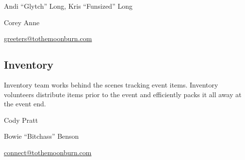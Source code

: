 



\begin{description}[leftmargin=6em,noitemsep,style=nextline]
   \item[Leads:]  Andi ``Glytch'' Long, Kris ``Funsized'' Long
   \item[Co-leads:] Corey Anne
   \item[Contact:] \url{greeters@tothemoonburn.com}
\end{description}

\subsection*{Inventory}
Inventory team works behind the scenes tracking event items. Inventory volunteers distribute items prior to the event and efficiently packs it all away at the event end.

\begin{description}[leftmargin=6em,noitemsep,style=nextline]
   \item[Leads:]  Cody Pratt
   \item[Co-leads:] Bowie ``Bitchass'' Benson
   \item[Contact:]  \url{connect@tothemoonburn.com}
\end{description}



